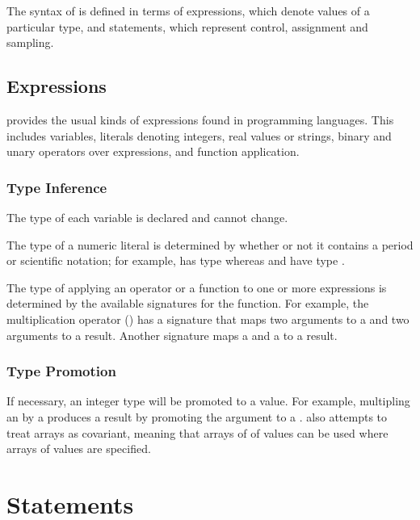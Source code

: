 \documentclass[article]{jss}
\begin{document}
The syntax of  is defined in terms of expressions, which
denote values of a particular type, and statements, which represent
control, assignment and sampling.

\subsection{Expressions}

 provides the usual kinds of expressions found in
programming languages.  This includes variables, literals denoting
integers, real values or strings, binary and unary operators over
expressions, and function application.  

\subsubsection{Type Inference}

The type of each variable is declared and cannot change.  

The type of a numeric literal is determined by whether or not it
contains a period or scientific notation; for example,  has
type  whereas  and  have type
.

The type of applying an operator or a function to one or more
expressions is determined by the available signatures for the
function.  For example, the multiplication operator (\code{*}) has a
signature that maps two  arguments to a  and two
 arguments to a  result.  Another signature maps
a  and a  to a  result.

\subsubsection{Type Promotion}

If necessary, an integer type will be promoted to a  value.
For example, multipling an  by a  produces a
 result by promoting the  argument to a
.   also attempts to treat arrays as
covariant, meaning that arrays of of  values can be used
where arrays of  values are specified.

\section{Statements}
\end{document}
